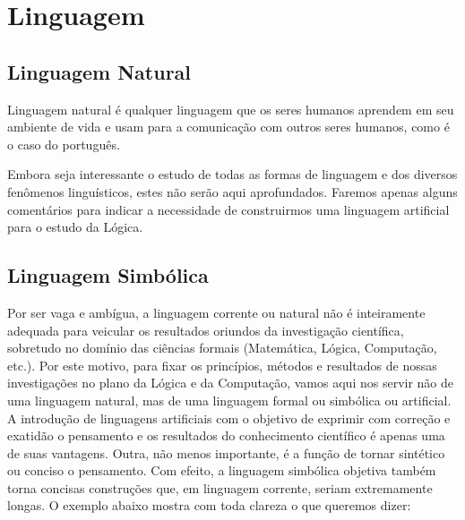 \documentclass[
	12pt,				%
	twoside,			%
	a4paper,			%
	english,			%
	french,				%
	spanish,			%
	brazil,				%
	]{abntex2}
\begin{document}
\pagestyle{plain}

\chapter{Linguagem}
\section{Linguagem Natural}

\thispagestyle{plain}


Linguagem natural é qualquer linguagem que os seres humanos aprendem em seu ambiente de vida e usam para a comunicação com outros seres humanos, como é o caso do português.

Embora seja interessante o estudo de todas as formas de linguagem e dos diversos fenômenos linguísticos, estes não serão aqui aprofundados. Faremos apenas alguns comentários para indicar a necessidade de construirmos uma linguagem artificial para o estudo da Lógica.

\newpage

\lipsum[50]

\lipsum[50]

\lipsum[50]

\lipsum[50]

\newpage

\section{Linguagem Simbólica}
Por ser vaga e ambígua, a linguagem corrente ou natural não é inteiramente adequada para veicular os resultados oriundos da investigação científica, sobretudo no domínio das ciências formais (Matemática, Lógica, Computação, etc.). Por este motivo, para fixar os princípios, métodos e resultados de nossas investigações no plano da Lógica e da Computação, vamos aqui nos servir não de uma linguagem natural, mas de uma linguagem formal ou simbólica ou artificial. A introdução de linguagens artificiais com o objetivo de exprimir com correção e exatidão o pensamento e os resultados do conhecimento científico é apenas uma de suas vantagens. Outra, não menos importante, é a função de tornar sintético ou conciso o pensamento. Com efeito, a linguagem simbólica objetiva também torna concisas construções que, em linguagem corrente, seriam extremamente longas. O exemplo abaixo mostra com toda clareza o que queremos dizer:
\end{document}
